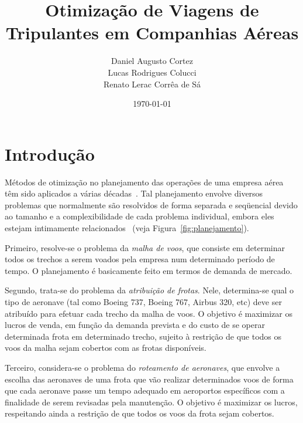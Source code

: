 \documentclass[12pt,a4paper]{article}
\newcommand{\zerar}{\setcounter{equation}{0}\setcounter{figure}{0}\setcounter{table}{0}}
\begin{document}
\title{\bf Otimização de Viagens de Tripulantes em Companhias Aéreas}
\author{Daniel Augusto Cortez \\ Lucas Rodrigues Colucci \\ Renato Lerac Corrêa de Sá}
\date{\today}

\maketitle

\begin{abstract}

\end{abstract}

\thispagestyle{empty}

\newpage 

\tableofcontents

\newpage


\zerar
\section{Introdução}
\label{sec:introducao}

Métodos de otimização no planejamento das operações de uma empresa aérea têm sido aplicados a várias
décadas~\cite{yu}. Tal planejamento envolve diversos problemas que normalmente são resolvidos de
forma separada e seqüencial devido ao tamanho e a complexibilidade de cada problema individual,
embora eles estejam intimamente relacionados~\cite{barnhart03} (veja Figura~\ref{fig:planejamento}).

Primeiro, resolve-se o problema da \emph{malha de voos}, que consiste em determinar todos os trechos
a serem voados pela empresa num determinado período de tempo. O planejamento é basicamente feito em
termos de demanda de mercado.

Segundo, trata-se do problema da \emph{atribuição de frotas}. Nele, determina-se qual o tipo de
aeronave (tal como Boeing 737, Boeing 767, Airbus 320, etc) deve ser atribuído para efetuar cada
trecho da malha de voos. O objetivo é maximizar os lucros de venda, em função da demanda prevista e
do custo de se operar determinada frota em determinado trecho, sujeito à restrição de que todos os
voos da malha sejam cobertos com as frotas disponíveis.

Terceiro, considera-se o problema do \emph{roteamento de aeronaves}, que envolve a escolha das
aeronaves de uma frota que vão realizar determinados voos de forma que cada aeronave passe um tempo
adequado em aeroportos específicos com a finalidade de serem revisadas pela manutenção. O objetivo é
maximizar os lucros, respeitando ainda a restrição de que todos os voos da frota sejam cobertos.
\end{document}
